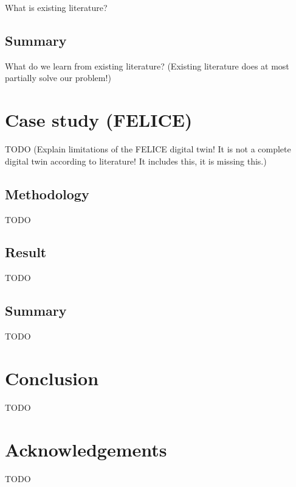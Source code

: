 \documentclass[9pt,conference]{IEEEtran}
\begin{document}
    What is existing literature?

    \subsection{Summary}
    \label{section:liteature_summary}

    What do we learn from existing literature?
    (Existing literature does at most partially solve our problem!)

    \section{Case study (FELICE)}
    \label{section:case}

    TODO (Explain limitations of the FELICE digital twin! It is not a complete digital twin according to literature! It includes this, it is missing this.)

    \subsection{Methodology}
    \label{section:case_methodology}

    TODO

    \subsection{Result}
    \label{section:case_result}

    TODO

    \subsection{Summary}
    \label{section:case_summary}

    TODO

    \section{Conclusion}
    \label{section:conclusion}
    TODO

    \section*{Acknowledgements}
    TODO

    
    
\end{document}
